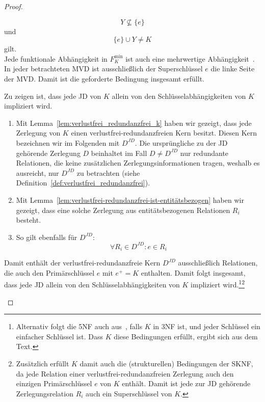 \begin{proof}
\begin{description}
\begin{description}
\[            Y \nsubseteq \{e\}
        \]
        und
        \[
            \{e\} \cup Y \neq K
        \]
        gilt.\\
        Jede funktionale Abhängigkeit in $F^\text{min}_{K}$ ist auch eine mehrwertige Abhängigkeit~\cite[S. 353]{EN11}.\\
        In jeder betrachteten MVD ist ausschließlich der Superschlüssel $e$ die linke Seite der MVD.
        Damit ist die geforderte Bedingung insgesamt erfüllt.
            \end{description}
        \item[5. Normalform:] Zu zeigen ist, dass jede JD von $K$ allein von den Schlüsselabhängigkeiten von $K$ impliziert wird.
        \begin{enumerate}
            \item Mit Lemma~\ref{lem:verlustfrei_redundanzfrei_k} haben wir gezeigt, dass jede Zerlegung von $K$ einen verlustfrei-redundanzfreien Kern besitzt.
            Diesen Kern bezeichnen wir im Folgenden mit $D^{JD}$.
            Die ursprüngliche zu der JD gehörende Zerlegung $D$ beinhaltet im Fall $D \neq D^{JD}$ nur redundante Relationen, die keine zusätzlichen Zerlegungsinformationen tragen, weshalb es ausreicht, nur $D^{JD}$ zu betrachten (siehe Definition~\ref{def:verlustfrei_redundanzfrei}).
            \item Mit Lemma~\ref{lem:verlustfrei-redundanzfrei-ist-entitätsbezogen} haben wir gezeigt, dass eine solche Zerlegung aus entitätsbezogenen Relationen $R_{i}$ besteht.
            \item So gilt ebenfalls für $D^{JD}$:
            \[
                \forall R_{i} \in D^{JD}: e \in R_{i}
            \]
        \end{enumerate}

        Damit enthält der verlustfrei-redundanzfreie Kern $D^{JD}$ ausschließlich Relationen, die auch den Primärschlüssel $e$ mit $e^+ = K$ enthalten.
        Damit folgt insgesamt, dass jede JD allein von den Schlüsselabhängigkeiten von $K$ impliziert wird.\footnote{
            Alternativ folgt die 5NF auch aus~\cite[Theorem 4.1]{DF92}, falls $K$ in 3NF ist, und jeder Schlüssel ein einfacher Schlüssel ist.
            Dass $K$ diese Bedingungen erfüllt, ergibt sich aus dem Text.
        }\footnote{
            Zusätzlich erfüllt $K$ damit auch die (strukturellen) Bedingungen der SKNF, da jede Relation einer verlustfrei-redundanzfreien Zerlegung auch den einzigen Primärschlüssel $e$ von $K$ enthält. Damit ist jede zur JD gehörende Zerlegungsrelation $R_i$ auch ein Superschlüssel von $K$.
        }

    \end{description}
\end{proof}
\bigskip




